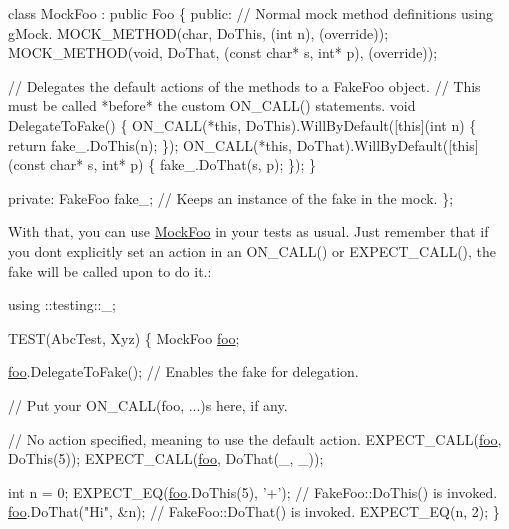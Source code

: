 \begin{DoxyCode}
\textcolor{keyword}{class }MockFoo : \textcolor{keyword}{public} Foo \{
 \textcolor{keyword}{public}:
  \textcolor{comment}{// Normal mock method definitions using gMock.}
  MOCK\_METHOD(\textcolor{keywordtype}{char}, DoThis, (\textcolor{keywordtype}{int} n), (\textcolor{keyword}{override}));
  MOCK\_METHOD(\textcolor{keywordtype}{void}, DoThat, (\textcolor{keyword}{const} \textcolor{keywordtype}{char}* s, \textcolor{keywordtype}{int}* p), (\textcolor{keyword}{override}));

  \textcolor{comment}{// Delegates the default actions of the methods to a FakeFoo object.}
  \textcolor{comment}{// This must be called *before* the custom ON\_CALL() statements.}
  \textcolor{keywordtype}{void} DelegateToFake() \{
    ON\_CALL(*\textcolor{keyword}{this}, DoThis).WillByDefault([\textcolor{keyword}{this}](\textcolor{keywordtype}{int} n) \{
      \textcolor{keywordflow}{return} fake\_.DoThis(n);
    \});
    ON\_CALL(*\textcolor{keyword}{this}, DoThat).WillByDefault([\textcolor{keyword}{this}](\textcolor{keyword}{const} \textcolor{keywordtype}{char}* s, \textcolor{keywordtype}{int}* p) \{
      fake\_.DoThat(s, p);
    \});
  \}

 \textcolor{keyword}{private}:
  FakeFoo fake\_;  \textcolor{comment}{// Keeps an instance of the fake in the mock.}
\};
\end{DoxyCode}


With that, you can use {\ttfamily \mbox{\hyperlink{classMockFoo}{Mock\+Foo}}} in your tests as usual. Just remember that if you don\textquotesingle{}t explicitly set an action in an {\ttfamily O\+N\+\_\+\+C\+A\+L\+L()} or {\ttfamily E\+X\+P\+E\+C\+T\+\_\+\+C\+A\+L\+L()}, the fake will be called upon to do it.\+:


\begin{DoxyCode}
using ::testing::\_;

TEST(AbcTest, Xyz) \{
  MockFoo \mbox{\hyperlink{namespacefoo}{foo}};

  \mbox{\hyperlink{namespacefoo}{foo}}.DelegateToFake();  \textcolor{comment}{// Enables the fake for delegation.}

  \textcolor{comment}{// Put your ON\_CALL(foo, ...)s here, if any.}

  \textcolor{comment}{// No action specified, meaning to use the default action.}
  EXPECT\_CALL(\mbox{\hyperlink{namespacefoo}{foo}}, DoThis(5));
  EXPECT\_CALL(\mbox{\hyperlink{namespacefoo}{foo}}, DoThat(\_, \_));

  \textcolor{keywordtype}{int} n = 0;
  EXPECT\_EQ(\mbox{\hyperlink{namespacefoo}{foo}}.DoThis(5), \textcolor{charliteral}{'+'});  \textcolor{comment}{// FakeFoo::DoThis() is invoked.}
  \mbox{\hyperlink{namespacefoo}{foo}}.DoThat(\textcolor{stringliteral}{"Hi"}, &n);  \textcolor{comment}{// FakeFoo::DoThat() is invoked.}
  EXPECT\_EQ(n, 2);
\}
\end{DoxyCode}


